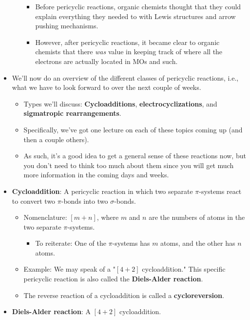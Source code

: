 \documentclass[../notes.tex]{subfiles}
\begin{document}
\begin{itemize}
\begin{itemize}
        \begin{itemize}
            \item Before pericyclic reactions, organic chemists thought that they could explain everything they needed to with Lewis structures and arrow pushing mechanisms.
            \item However, after pericyclic reactions, it became clear to organic chemists that there \emph{was} value in keeping track of where all the electrons are actually located in MOs and such.
        \end{itemize}
    \end{itemize}
    \item We'll now do an overview of the different classes of pericyclic reactions, i.e., what we have to look forward to over the next couple of weeks.
    \begin{itemize}
        \item Types we'll discuss: \textbf{Cycloadditions}, \textbf{electrocyclizations}, and \textbf{sigmatropic rearrangements}.
        \item Specifically, we've got one lecture on each of these topics coming up (and then a couple others).
        \item As such, it's a good idea to get a general sense of these reactions now, but you don't need to think too much about them since you will get much more information in the coming days and weeks.
    \end{itemize}
    \item \textbf{Cycloaddition}: A pericyclic reaction in which two separate $\pi$-systems react to convert two $\pi$-bonds into two $\sigma$-bonds.
    \begin{itemize}
        \item Nomenclature: $[m+n]$, where $m$ and $n$ are the numbers of atoms in the two separate $\pi$-systems.
        \begin{itemize}
            \item To reiterate: One of the $\pi$-systems has $m$ atoms, and the other has $n$ atoms.
        \end{itemize}
        \item Example: We may speak of a "$[4+2]$ cycloaddition." This specific pericyclic reaction is also called the \textbf{Diels-Alder reaction}.
        \item The reverse reaction of a cycloaddition is called a \textbf{cycloreversion}.
    \end{itemize}
    \item \textbf{Diels-Alder reaction}: A $[4+2]$ cycloaddition.

\end{itemize}
\end{document}
